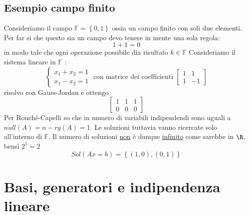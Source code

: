 \documentclass[12pt,a4paper,oneside]{article}
\begin{document}
\subsection{Esempio campo finito}
Consideriamo il campo $ \mathbb{F}=\left\{ 0,1 \right\} $ ossia un campo finito con soli due elementi. Per far si che questo sia un campo devo tenere in mente una sola regola:
\[
	1+1=0
\]
in modo tale che ogni operazione possibile dia risultato $k \in  \mathbb{F}$
\vskip3mm
Consideriamo il sistema lineare in $ \mathbb{F}$ :
\[
	\begin{cases}
		x_1+x_2=1 \\
		x_1-x_2=1
	\end{cases}
	\text{ con matrice dei coefficienti }
	\begin{bmatrix}
		1 & 1  \\
		1 & -1
	\end{bmatrix}
\]
risolvo con Gauss-Jordan e ottengo
\[
	\begin{bmatrix}
		1 & 1 & 1 \\
		0 & 0 & 0
	\end{bmatrix}
\]
Per Rouché-Capelli so che in numero di variabili indipendendi sono uguali a $null\left( A \right) = n-rg\left( A \right) = 1$. Le soluzioni tuttavia vanno ricercate solo all'interno di $ \mathbb{F}$. Il numero di soluzioni \underline{non} è dunque \underline{infinito} come sarebbe in $\R$, bensì $2^{1}=2$
\[
	Sol\left( Ax=b \right) = \left\{ \left( 1,0 \right) , \left( 0,1 \right)  \right\}
\]

\section{Basi, generatori e indipendenza lineare}
\end{document}
